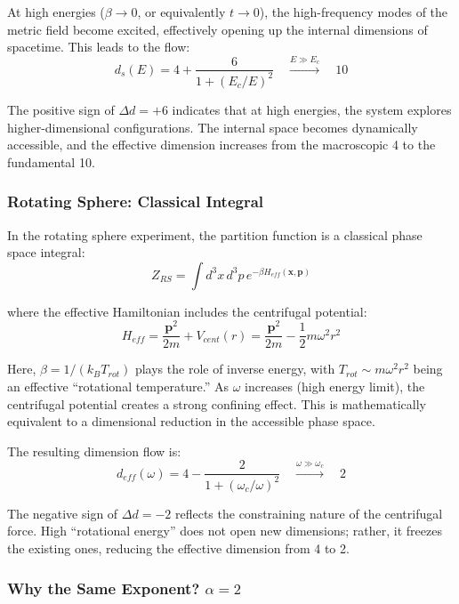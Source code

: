 \documentclass[UTF8]{ctex}\n\documentclass[12pt,a4paper]{article}
\begin{document}
At high energies ($\beta \to 0$, or equivalently $t \to 0$), the high-frequency modes of the metric field become excited, effectively opening up the internal dimensions of spacetime. This leads to the flow:
\begin{equation}
    d_s(E) = 4 + \frac{6}{1+(E_c/E)^2} \quad \xrightarrow{E \gg E_c} \quad 10
\end{equation}

The positive sign of $\Delta d = +6$ indicates that at high energies, the system explores higher-dimensional configurations. The internal space becomes dynamically accessible, and the effective dimension increases from the macroscopic 4 to the fundamental 10.

\subsubsection{Rotating Sphere: Classical Integral}

In the rotating sphere experiment, the partition function is a classical phase space integral:
\begin{equation}
    Z_{RS} = \int d^3x \, d^3p \, e^{-\beta H_{eff}(\mathbf{x}, \mathbf{p})}
\end{equation}

where the effective Hamiltonian includes the centrifugal potential:
\begin{equation}
    H_{eff} = \frac{\mathbf{p}^2}{2m} + V_{cent}(r) = \frac{\mathbf{p}^2}{2m} - \frac{1}{2}m\omega^2 r^2
\end{equation}

Here, $\beta = 1/(k_B T_{rot})$ plays the role of inverse energy, with $T_{rot} \sim m\omega^2 r^2$ being an effective ``rotational temperature.'' As $\omega$ increases (high energy limit), the centrifugal potential creates a strong confining effect. This is mathematically equivalent to a dimensional reduction in the accessible phase space.

The resulting dimension flow is:
\begin{equation}
    d_{eff}(\omega) = 4 - \frac{2}{1+(\omega_c/\omega)^2} \quad \xrightarrow{\omega \gg \omega_c} \quad 2
\end{equation}

The negative sign of $\Delta d = -2$ reflects the constraining nature of the centrifugal force. High ``rotational energy'' does not open new dimensions; rather, it freezes the existing ones, reducing the effective dimension from 4 to 2.

\subsubsection{Why the Same Exponent? $\alpha = 2$}
\end{document}
